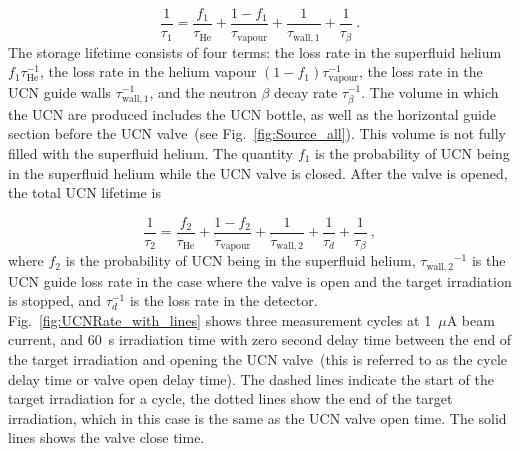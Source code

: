 \begin{equation}
  \label{eqn:tau1}
  \frac{1}{\tau_1} = \frac{ f_1}{\tau_\mathrm{He}} + \frac{1-f_1}{\tau_\mathrm{vapour}}+\frac{1}{\tau_\mathrm{wall,1}} + \frac{1}{\tau_\beta}~.
\end{equation}
The storage lifetime consists of four terms: the loss rate in the
superfluid helium $ f_1\tau_\mathrm{He}^{-1}$, the loss rate in the
helium vapour $(1-f_1)\tau_\mathrm{vapour}^{-1}$, the loss rate in the
UCN guide walls $\tau_\mathrm{wall,1}^{-1}$, and the neutron $\beta$
decay rate $\tau_\beta^{-1}$. The volume in which the UCN are produced
includes the UCN bottle, as well as the horizontal guide section
before the UCN valve~(see Fig.~\ref{fig:Source_all}). This volume is
not fully filled with the superfluid helium. The quantity $ f_1$ is
the probability of UCN being in the superfluid helium while the UCN
valve is closed. After the valve is opened, the total UCN lifetime is

\begin{equation}
  \label{eqn:tau2}
  \frac{1}{\tau_2} = \frac{ f_2}{\tau_\mathrm{He}} + \frac{1-f_2}{\tau_\mathrm{vapour}}+ \frac{1}{\tau_\mathrm{wall,2}}+\frac{1}{\tau_d} + \frac{1}{\tau_\beta}~,
\end{equation}
where $f_2$ is the probability of UCN being in the superfluid helium,
${\tau_\mathrm{wall,2}}^{-1}$ is the UCN guide loss rate in the case
where the valve is open and the target irradiation is stopped, and
$\tau_d^{-1}$ is the loss rate in the
detector. Fig.~\ref{fig:UCNRate_with_lines} shows three measurement
cycles at 1~$\mu$A beam current, and 60~s irradiation time with zero
second delay time between the end of the target irradiation and
opening the UCN valve~(this is referred to as the cycle delay time or
valve open delay time). The dashed lines indicate the start of the
target irradiation for a cycle, the dotted lines show the end of the
target irradiation, which in this case is the same as the UCN valve
open time. The solid lines shows the valve close time.


